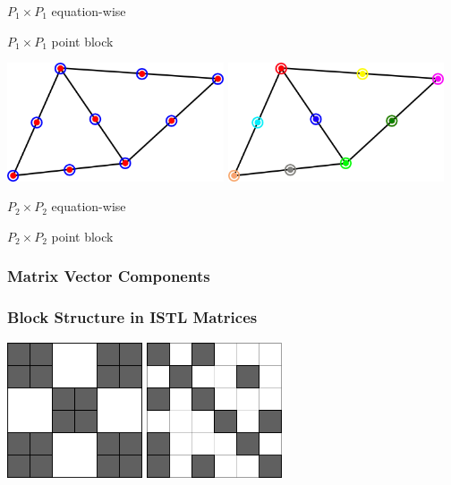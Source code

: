 {\begin{frame}
\begin{block}{}
\begin{minipage}{0.48\textwidth}
\centering $P_1\times P_1$ equation-wise
\end{minipage}
\begin{minipage}{0.48\textwidth}
\centering $P_1\times P_1$ point block
\end{minipage}

\includegraphics[width=0.48\textwidth]{./EPS/P2P2}\hfill
\includegraphics[width=0.48\textwidth]{./EPS/P2P2b}

\begin{minipage}{0.48\textwidth}
\centering $P_2\times P_2$ equation-wise
\end{minipage}
\begin{minipage}{0.48\textwidth}
\centering $P_2\times P_2$ point block
\end{minipage}
\end{block}
\end{frame}

\subsubsection{Matrix Vector Components}
\label{sec:matr-vect-comp}

\begin{frame}[fragile]
\frametitle{Block Structure in ISTL Matrices}
\begin{block}{}
\includegraphics[width=0.3\textwidth]{./EPS/pointblockmatrix}\hfill
\includegraphics[width=0.3\textwidth]{./EPS/scalarmatrix}


\end{block}
\end{frame}}
